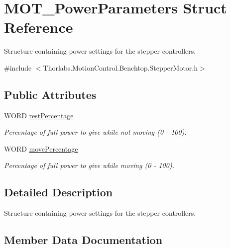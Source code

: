 \hypertarget{struct_m_o_t___power_parameters}{}\section{M\+O\+T\+\_\+\+Power\+Parameters Struct Reference}
\label{struct_m_o_t___power_parameters}


Structure containing power settings for the stepper controllers.  




{\ttfamily \#include $<$Thorlabs.\+Motion\+Control.\+Benchtop.\+Stepper\+Motor.\+h$>$}

\subsection*{Public Attributes}
\begin{DoxyCompactItemize}
\item 
W\+O\+RD \hyperlink{struct_m_o_t___power_parameters_a8fb98520378f46ac36cab00c45f2732d}{rest\+Percentage}
\begin{DoxyCompactList}\small\item\em Percentage of full power to give while not moving (0 -\/ 100). \end{DoxyCompactList}\item 
W\+O\+RD \hyperlink{struct_m_o_t___power_parameters_aca9f0ebd5a40f420cfe5ec7e8bd14cb2}{move\+Percentage}
\begin{DoxyCompactList}\small\item\em Percentage of full power to give while moving (0 -\/ 100). \end{DoxyCompactList}\end{DoxyCompactItemize}


\subsection{Detailed Description}
Structure containing power settings for the stepper controllers. 



\subsection{Member Data Documentation}
